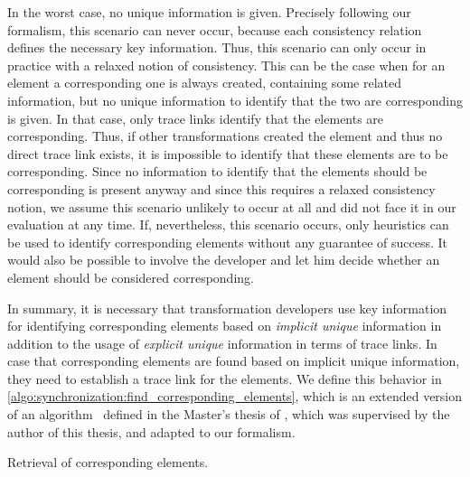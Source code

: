 In the worst case, no unique information is given.
Precisely following our formalism, this scenario can never occur, because each consistency relation defines the necessary key information.
Thus, this scenario can only occur in practice with a relaxed notion of consistency.
This can be the case when for an element a corresponding one is always created, containing some related information, but no unique information to identify that the two are corresponding is given.
In that case, only trace links identify that the elements are corresponding.
Thus, if other transformations created the element and thus no direct trace link exists, it is impossible to identify that these elements are to be corresponding.
Since no information to identify that the elements should be corresponding is present anyway and since this requires a relaxed consistency notion, we assume this scenario unlikely to occur at all and did not face it in our evaluation at any time.
If, nevertheless, this scenario occurs, only heuristics can be used to identify corresponding elements without any guarantee of success.
It would also be possible to involve the developer and let him decide whether an element should be considered corresponding.

In summary, it is necessary that transformation developers use key information for identifying corresponding elements based on \emph{implicit unique} information in addition to the usage of \emph{explicit unique} information in terms of trace links. %
In case that corresponding elements are found based on implicit unique information, they need to establish a trace link for the elements.
We define this behavior in \autoref{algo:synchronization:find_corresponding_elements}, which is an extended version of an algorithm~ defined in the Master's thesis of \citeauthor{saglam2020ma}, which was supervised by the author of this thesis, and adapted to our formalism.

\begin{algorithm}
    
    \caption[Retrieval of corresponding elements]{Retrieval of corresponding elements.}
    \label{algo:synchronization:find_corresponding_elements}
\end{algorithm}

